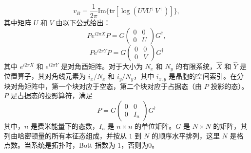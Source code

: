 \begin{equation}
    v_B = \frac{1}{2\pi} \text{Im}\{\text{tr}[\log(UVU^+V^+)]\},
\end{equation}
其中矩阵 \(U\) 和 \(V\) 由以下公式给出：
\begin{equation}
    Pe^{i2\pi X}P = G\begin{pmatrix} 0 & 0 \\ 0 & U \end{pmatrix}G^\dagger,
    \label{eq:projectP}
\end{equation}
\begin{equation}
Pe^{i2\pi Y}P = G\begin{pmatrix} 0 & 0 \\ 0 & V \end{pmatrix}G^\dagger
\end{equation}
其中 \(e^{i2\pi X}\) 和 \(e^{i2\pi Y}\) 是对角酉矩阵。对于大小为 \(N_x\) 和 \(N_y\) 的有限系统，\(\hat{X}\) 和 \(\hat{Y}\) 是位置算子，其对角线元素为 \(i_x/N_x\) 和 \(i_y/N_y\)，其中 \(i_{x,y}\) 是晶胞的空间索引。在分块对角矩阵中，第一个块对应于空态，第二个块对应于占据态（由 \(P\) 投影的态）。 \(P\) 是占据态的投影算符，满足
\begin{equation}
P = G\begin{pmatrix} 0 & 0 \\ 0 & I_n \end{pmatrix}G^\dagger
\end{equation}
其中，$n$ 是费米能量下的态数，$I_n$ 是 $n \times n$ 的单位矩阵。$G$ 是 $N \times N$ 的矩阵，其列由哈密顿量的所有本征态组成，并按从 $1$ 到 $N$ 的顺序水平排列，这里 $N$ 是格点数。当系统是拓扑时，Bott 指数为 $1$，否则为0。

